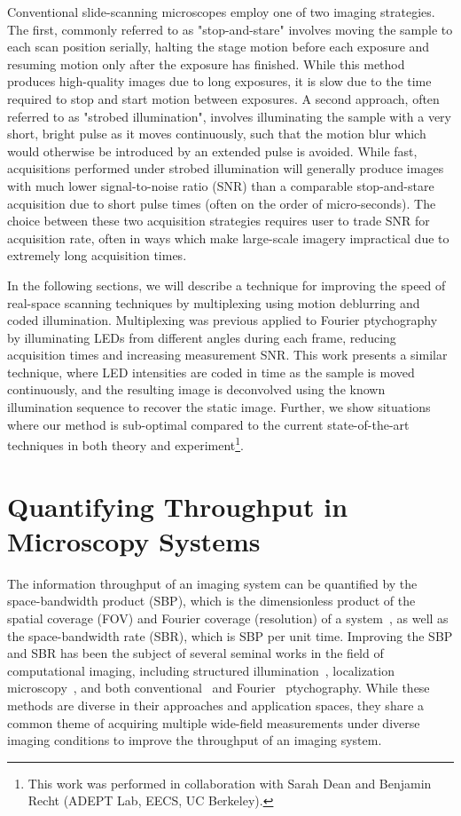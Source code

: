 Conventional slide-scanning microscopes employ one of two imaging strategies. The first, commonly referred to as "stop-and-stare" involves moving the sample to each scan position serially, halting the stage motion before each exposure and resuming motion only after the exposure has finished. While this method produces high-quality images due to long exposures, it is slow due to the time required to stop and start motion between exposures. A second approach, often referred to as "strobed illumination", involves illuminating the sample with a very short, bright pulse as it moves continuously, such that the motion blur which would otherwise be introduced by an extended pulse is avoided. While fast, acquisitions performed under strobed illumination will generally produce images with much lower signal-to-noise ratio (SNR) than a comparable stop-and-stare acquisition due to short pulse times (often on the order of micro-seconds). The choice between these two acquisition strategies requires user to trade SNR for acquisition rate, often in ways which make large-scale imagery impractical due to extremely long acquisition times.

In the following sections, we will describe a technique for improving the speed of real-space scanning techniques by multiplexing using motion deblurring and coded illumination. Multiplexing was previous applied to Fourier ptychography~\cite{Tian2014} by illuminating LEDs from different angles during each frame, reducing acquisition times and increasing measurement SNR. This work presents a similar technique, where LED intensities are coded in time as the sample is moved continuously, and the resulting image is deconvolved using the known illumination sequence to recover the static image. Further, we show situations where our method is sub-optimal compared to the current state-of-the-art techniques in both theory and experiment\footnote{This work was performed in collaboration with Sarah Dean and Benjamin Recht (ADEPT Lab, EECS, UC Berkeley).}.

\section{Quantifying Throughput in Microscopy Systems}
The information throughput of an imaging system can be quantified by the space-bandwidth product (SBP), which is the dimensionless product of the spatial coverage (FOV) and Fourier coverage (resolution) of a system~\cite{Lohmann1996space}, as well as the space-bandwidth rate (SBR), which is SBP per unit time. Improving the SBP and SBR has been the subject of several seminal works in the field of computational imaging, including structured illumination~\cite{gustafsson2000surpassing}, localization microscopy~\cite{Rust:06, betzig2006imaging}, and both conventional~\cite{rodenburg2004phase} and Fourier~\cite{Zheng2013,tian2015computational,Tian2014} ptychography. While these methods are diverse in their approaches and application spaces, they share a common theme of acquiring multiple wide-field measurements under diverse imaging conditions to improve the throughput of an imaging system.

